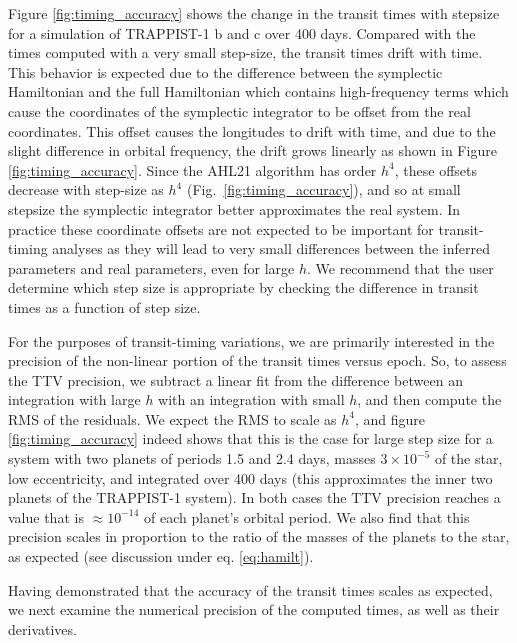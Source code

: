 \documentclass[fleqn,usenatbib,twocolumn]{mnras}
\begin{document}
Figure \ref{fig:timing_accuracy} shows the change in the transit times with stepsize for a simulation of TRAPPIST-1 b and c over 400
days.  Compared with the times computed with a very small step-size, the transit times drift with time.  This behavior is expected due to the difference between the symplectic Hamiltonian and the full Hamiltonian which contains high-frequency terms which cause the coordinates of the symplectic integrator to be offset from the real coordinates.  This offset causes the longitudes to drift with time, and due to the slight difference in orbital frequency, the drift grows linearly as shown in Figure \ref{fig:timing_accuracy}.  Since the AHL21 algorithm has order $h^4$, these offsets decrease with step-size as $h^4$ (Fig.\ \ref{fig:timing_accuracy}), and so at small stepsize the symplectic integrator better approximates the real system.  In practice these coordinate offsets are not expected to be important for transit-timing analyses as they will lead to very small differences between the inferred parameters and real parameters, even for large $h$.  We recommend that the user determine which step size is appropriate by checking the difference in transit times as a function of step size.

For the purposes of transit-timing variations, we
are primarily interested in the precision of the non-linear portion
of the transit times versus epoch.   So, to assess the TTV precision,
we subtract a linear fit from the difference between an integration
with large $h$ with an integration with small $h$, and then compute
the RMS of the residuals.  We expect the RMS to scale as $h^{4}$, and
figure \ref{fig:timing_accuracy} indeed shows that this is the case
for large step size for a system with two planets of periods 1.5 and 2.4 days,
masses $3 \times 10^{-5}$ of the star, low eccentricity, and integrated
over 400 days (this approximates the inner two planets of the TRAPPIST-1 system).  In both cases the TTV precision reaches
a value that is $\approx 10^{-14}$ of each planet's orbital period.  We also find that this precision scales in proportion to the ratio of the masses of the planets to the star, as expected (see discussion under eq. \eqref{eq:hamilt}).

Having demonstrated that the accuracy of the transit times scales as expected, we next examine the numerical precision of the computed times, as well as their derivatives.
\end{document}

